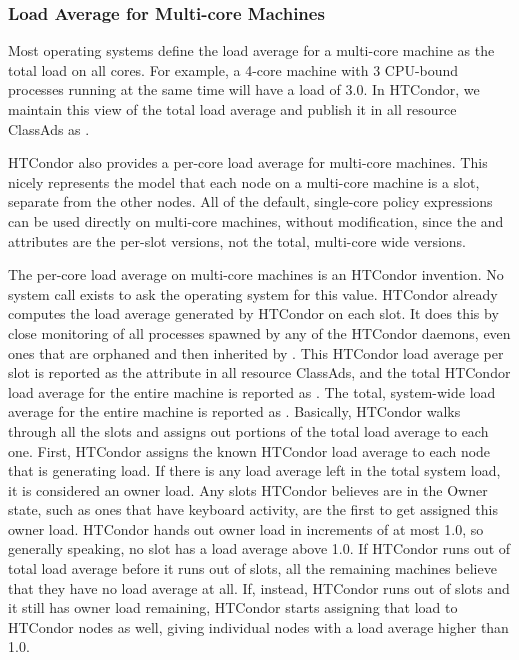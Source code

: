 \subsubsection{\label{sec:Multi-core-Load}
Load Average for Multi-core Machines}

Most operating systems define the load average for a multi-core machine as
the total load on all cores.
For example, a 4-core machine with 3 CPU-bound processes
running at the same time will have a load of 3.0.
In HTCondor, we maintain this view of the total load average and publish
it in all resource ClassAds as .

HTCondor also provides a per-core load average for multi-core machines.
This nicely represents the model that each node on a multi-core machine
is a slot,
separate from the other nodes.
All of the default, single-core policy expressions can be used directly
on multi-core machines, without modification, since the  and
 attributes are the per-slot versions,
not the total, multi-core wide versions.

The per-core load average on multi-core machines is an HTCondor invention. 
No system call exists to ask the operating system for this value.
HTCondor already computes the load average generated by HTCondor on each
slot.
It does this by close monitoring of all processes spawned by any of the
HTCondor daemons, even ones that are orphaned and then inherited by
. 
This HTCondor load average per slot is reported as
the attribute
 in all resource ClassAds, and the total HTCondor
load average for the entire machine is reported as
. 
The total, system-wide load average for the entire
machine  is reported as .
Basically, HTCondor walks through all the slots and assigns out
portions of the total load average to each one. 
First, HTCondor assigns the known HTCondor load average to each node that
is generating load.  
If there is any load average left in the total system load, 
it is considered an owner load.
Any slots HTCondor believes are in the Owner state,
such as ones that have keyboard activity,
are the first to get assigned this owner load.
HTCondor hands out owner load in increments of at most 1.0, so generally
speaking, no slot has a load average above 1.0.
If HTCondor runs out of total load average before it runs out of slots,
all the remaining machines believe that they have no load average at all.
If, instead, HTCondor runs out of slots and it still has owner
load remaining, HTCondor starts assigning that load to HTCondor nodes as
well,
giving individual nodes with a load average higher than 1.0.


